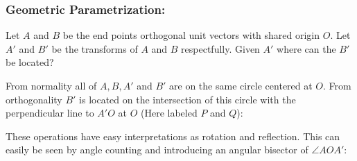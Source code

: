 \subsubsection{Geometric Parametrization:}
Let $A$ and $B$ be the end points orthogonal unit vectors with shared origin $O$.
Let $A'$ and $B'$ be the transforms of $A$ and $B$ respectfully.
Given $A'$ where can the $B'$ be located?
\begin{center}
\end{center}
From normality all of $A,B,A'$ and $B'$ are on the same circle centered at $O$.
From orthogonality $B'$ is located on the intersection of this circle with the perpendicular line to $A'O$ at $O$ (Here labeled $P$ and $Q$):
\begin{center}
\end{center}
These operations have easy interpretations as rotation and reflection.
This can easily be seen by angle counting and introducing an angular bisector of $\angle AOA'$:
